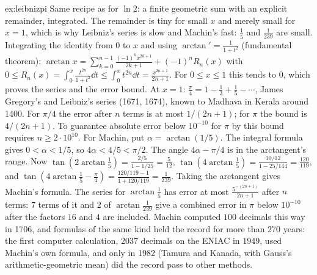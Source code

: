 \begin{solution}{ex:leibnizpi}
\idea Same recipe as for $\ln2$: a finite geometric sum with an explicit remainder, integrated. The remainder is tiny for small $x$ and merely small for $x=1$, which is why Leibniz's series is slow and Machin's fast: $\frac15$ and $\frac1{239}$ are small.
\writeup Integrating the identity from $0$ to $x$ and using $\arctan'=\frac1{1+t^2}$ (fundamental theorem): $\arctan x=\sum_{k=0}^{n-1}\frac{(-1)^kx^{2k+1}}{2k+1}+(-1)^nR_n(x)$ with $0\le R_n(x)=\int_0^x\frac{t^{2n}}{1+t^2}\dd t\le\int_0^xt^{2n}\dd t=\frac{x^{2n+1}}{2n+1}$. For $0\le x\le1$ this tends to $0$, which proves the series and the error bound. At $x=1$: $\frac\pi4=1-\frac13+\frac15-\cdots$, James Gregory's and Leibniz's series (1671, 1674), known to Madhava in Kerala around 1400.
For $\pi/4$ the error after $n$ terms is at most $1/(2n+1)$; for $\pi$ the bound is $4/(2n+1)$. To guarantee absolute error below $10^{-10}$ for $\pi$ by this bound requires $n\ge2\cdot10^{10}$. For Machin, put $\alpha=\arctan(1/5)$. The integral formula gives $0<\alpha<1/5$, so $4\alpha<4/5<\pi/2$. The angle $4\alpha-\pi/4$ is in the arctangent's range. Now $\tan\left(2\arctan\frac15\right)=\frac{2/5}{1-1/25}=\frac5{12}$, $\tan\left(4\arctan\frac15\right)=\frac{10/12}{1-25/144}=\frac{120}{119}$, and $\tan\left(4\arctan\frac15-\frac\pi4\right)=\frac{120/119-1}{1+120/119}=\frac1{239}$. Taking the arctangent gives Machin's formula. The series for $\arctan\frac15$ has error at most $\frac{5^{-(2n+1)}}{2n+1}$ after $n$ terms: $7$ terms of it and $2$ of $\arctan\frac1{239}$ give a combined error in $\pi$ below $10^{-10}$ after the factors $16$ and $4$ are included. Machin computed $100$ decimals this way in 1706, and formulas of the same kind held the record for more than 270 years: the first computer calculation, $2037$ decimals on the ENIAC in 1949, used Machin's own formula, and only in 1982 (Tamura and Kanada, with Gauss's arithmetic-geometric mean) did the record pass to other methods.
\end{solution}

